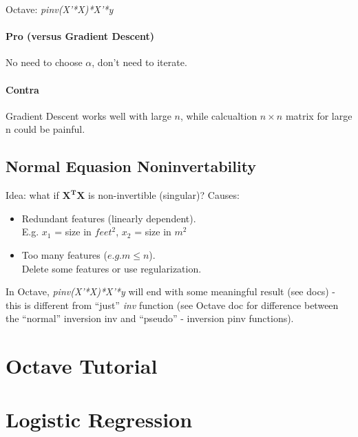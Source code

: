 \documentclass{scrartcl}
\begin{document}
Octave: \emph{ pinv(X'*X)*X'*y }

\paragraph {Pro (versus Gradient Descent)} No need to choose $\alpha$, don't need to iterate.

\paragraph {Contra} Gradient Descent works well with large $n$, while calcualtion
$n \times n$ matrix for large n could be painful.

\subsection {Normal Equasion Noninvertability}
Idea: what if $\mathbf{X^TX}$ is non-invertible (singular)?
Causes:\begin{itemize}
\item Redundant features (linearly dependent). \\
E.g. $x_1$ = size in $feet^2$,  $x_2$ = size in $m^2$
\item Too many features ($e.g. m \leq n$). \\
Delete some features or use regularization.

\end{itemize}

In Octave, \emph{pinv(X'*X)*X'*y} will end with some meaningful result (see
docs) - this is different from ``just'' \emph{inv} function (see
Octave doc for difference between the ``normal'' inversion inv and
``pseudo'' - inversion pinv functions).

\section {Octave Tutorial}



\section {Logistic Regression}

\end{document}
